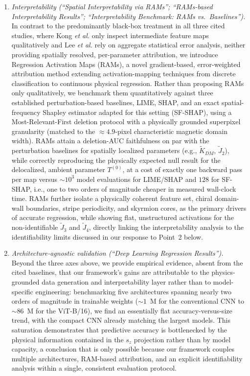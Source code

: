 \documentclass[review,12pt]{report}
\newenvironment{reviewer}{\setcounter{pointcounter}{1}}{}
\begin{document}
\begin{reviewer}
{\begin{enumerate}
\item \textit{Interpretability (``Spatial Interpretability via RAMs''; ``RAMs-based Interpretability Results''; ``Interpretability Benchmark: RAMs vs.\ Baselines'').} In contrast to the predominantly black-box treatment in all three cited studies, where Kong \textit{et al.} only inspect intermediate feature maps qualitatively and Lee \textit{et al.} rely on aggregate statistical error analysis, neither providing spatially resolved, per-parameter attribution, we introduce Regression Activation Maps (RAMs), a novel gradient-based, error-weighted attribution method extending activation-mapping techniques from discrete classification to continuous physical regression. Rather than proposing RAMs only qualitatively, we benchmark them quantitatively against three established perturbation-based baselines, LIME, SHAP, and an exact spatial-frequency Shapley estimator adapted for this setting (SF-SHAP), using a Most-Relevant-First deletion protocol with a physically grounded superpixel granularity (matched to the $\approx 4.9$-pixel characteristic magnetic domain width). RAMs attain a deletion-AUC faithfulness on par with the perturbation baselines for spatially localized parameters (e.g., $\tilde{K}_{DM}$, $\tilde{J}_2$), while correctly reproducing the physically expected null result for the delocalized, ambient parameter $T^{(0)}$, at a cost of exactly one backward pass per map versus $\sim\!10^3$ model evaluations for LIME/SHAP and $128$ for SF-SHAP, i.e., one to two orders of magnitude cheaper in measured wall-clock time. RAMs further isolate a physically coherent feature set, chiral domain-wall boundaries, stripe periodicity, and skyrmion cores, as the primary drivers of accurate regression, while showing flat, unstructured activations for the non-identifiable $\tilde{J}_3$ and $\tilde{J}_4$, directly linking the interpretability analysis to the identifiability limits discussed in our response to Point~2 below.

\item \textit{Architecture-agnostic validation (``Deep Learning Regression Results'').} Beyond the three axes above, we provide empirical evidence, absent from the cited baselines, that our framework's gains are attributable to the physics-grounded data generation and interpretability layer rather than to model-specific engineering: benchmarking five architectures spanning nearly two orders of magnitude in trainable weights ($\sim\!1$~M for the conventional CNN to $\sim\!86$~M for the ViT-B/16), we find an essentially flat accuracy-versus-size trend, with the compact CNN already matching the largest models. This saturation demonstrates that predictive accuracy is bottlenecked by the physical information contained in the $s_z$ projection rather than by model capacity, a conclusion that is only possible because our framework couples multiple architectures, RAM-based attribution, and an explicit identifiability analysis within a single, consistent evaluation protocol.
\end{enumerate}

}
\end{reviewer}
\end{document}
